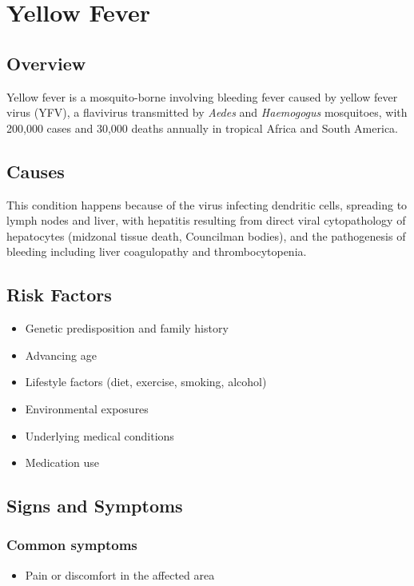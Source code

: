 \chapter{Yellow Fever}
\label{sec:Yellow Fever}

\section{Overview}
Yellow fever is a mosquito-borne involving bleeding fever caused by yellow fever virus (YFV), a flavivirus transmitted by \textit{Aedes} and \textit{Haemogogus} mosquitoes, with 200,000 cases and 30,000 deaths annually in tropical Africa and South America.
\section{Causes}
This condition happens because of the virus infecting dendritic cells, spreading to lymph nodes and liver, with hepatitis resulting from direct viral cytopathology of hepatocytes (midzonal tissue death, Councilman bodies), and the pathogenesis of bleeding including liver coagulopathy and thrombocytopenia.     
\section{Risk Factors}

\begin{itemize}[noitemsep]
  \item Genetic predisposition and family history
  \item Advancing age
  \item Lifestyle factors (diet, exercise, smoking, alcohol)
  \item Environmental exposures
  \item Underlying medical conditions
  \item Medication use
\end{itemize}
\section{Signs and Symptoms}

\subsection{Common symptoms}
\begin{itemize}[noitemsep]
  \item Pain or discomfort in the affected area
  \end{itemize}

